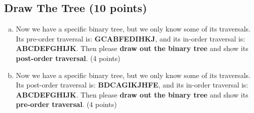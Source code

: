 \documentclass[11pt]{exam}
\begin{document}
\subsection{Draw The Tree (10 points)}
\begin{enumerate}[a)]
\item Now we have a specific binary tree, but we only know some of its traversals. Its pre-order traversal is: \textbf{GCABFEDIHKJ}, and its in-order traversal is: \textbf{ABCDEFGHIJK}. Then please \textbf{draw out the binary tree} and show its \textbf{post-order traversal}. (4 points)

\begin{solution}
    \par 
    \begin{center}
    \end{center}
\end{solution}

\item Now we have a specific binary tree, but we only know some of its traversals. Its post-order traversal is: \textbf{BDCAGIKJHFE}, and its in-order traversal is: \textbf{ABCDEFGHIJK}. Then please \textbf{draw out the binary tree} and show its \textbf{pre-order traversal}. (4 points)


\end{enumerate}
\end{document}
